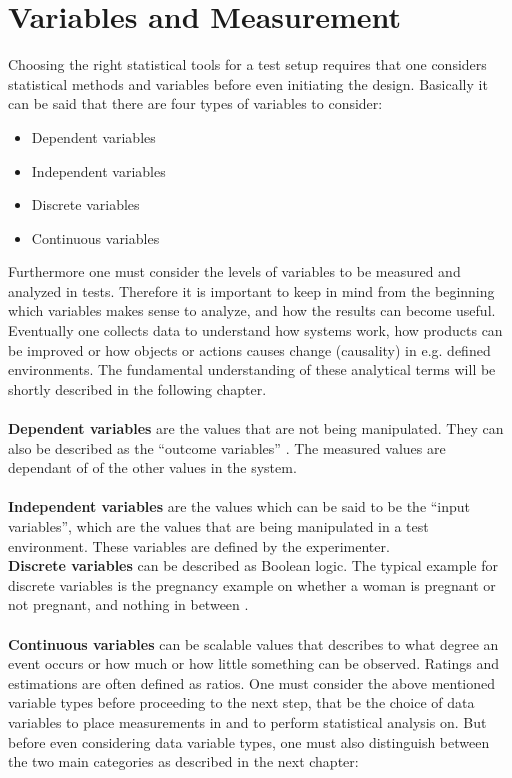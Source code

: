  \section{Variables and Measurement}
 Choosing the right statistical tools for a test setup requires that one considers statistical methods and variables before even initiating the design. Basically it can be said that there are four types of variables to consider: 
\begin{itemize}
  \item Dependent variables
  \item Independent variables
  \item Discrete variables
  \item Continuous variables
\end{itemize}
Furthermore one must consider the levels of variables to be measured and analyzed in tests. Therefore it is important to keep in mind from the beginning which variables makes sense to analyze, and how the results can become useful. Eventually one collects data to understand how systems work, how products can be improved or how objects or actions causes change (causality) in e.g. defined environments. The fundamental understanding of these analytical terms will be shortly described in the following chapter.\\\\
\textbf{Dependent variables} are the values that are not being manipulated. They can also be described as the “outcome variables” \citep[page 21]{Design}. The measured values are dependant of of the other values in the system.\\\\
\textbf{Independent variables} are the values which can be said to be the “input variables”, which are the values that are being manipulated in a test environment. These variables are defined by the experimenter.\\
\textbf{Discrete variables} can be described as Boolean logic. The typical example for discrete variables is the pregnancy example on whether a woman is pregnant or not pregnant, and nothing in between \citep[page 9]{Design}.\\\\
\textbf{Continuous variables} can be scalable values that describes to what degree an event occurs or how much or how little something can be observed. Ratings and estimations are often defined as ratios. 
One must consider the above mentioned variable types before proceeding to the next step, that be the choice of data variables to place measurements in and to perform statistical analysis on. But before even considering data variable types, one must also distinguish between the two main categories as described in the next chapter: 

